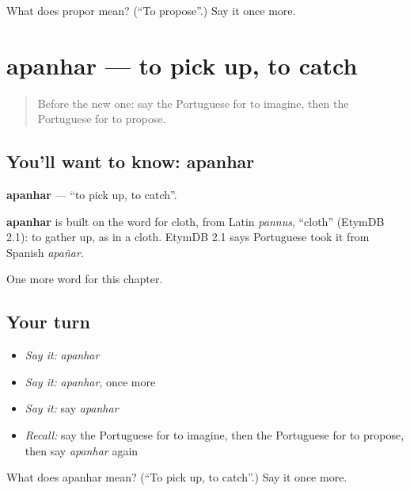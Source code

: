\begin{tcolorbox}[breakable,colback=teal!4,colframe=teal!35!black,title={Before you move on}]
What does propor mean? (\textquotedblleft{}To propose\textquotedblright{}.) Say it once more.
\end{tcolorbox}
\section[apanhar]{apanhar — to pick up, to catch}

\label{lesson:PT-C143-apanhar}



\begin{quote}
Before the new one: say the Portuguese for to imagine, then the Portuguese for to propose.
\end{quote}

\subsection*{You'll want to know: apanhar}
\textbf{apanhar} — \textquotedblleft{}to pick up, to catch\textquotedblright{}.

\begin{cousinweb}
\textbf{apanhar} is built on the word for cloth, from Latin \emph{pannus}, \textquotedblleft{}cloth\textquotedblright{} (EtymDB 2.1): to gather up, as in a cloth. EtymDB 2.1 says Portuguese took it from Spanish \emph{apañar}.
\end{cousinweb}

\begin{grammarlens}[title={What you've built}]
One more word for this chapter.
\end{grammarlens}

\subsection*{Your turn}
\begin{itemize}
\raggedright
  \item \emph{Say it:} \emph{apanhar}
  \item \emph{Say it:} \emph{apanhar}, once more
  \item \emph{Say it:} say \emph{apanhar}
  \item \emph{Recall:} say the Portuguese for to imagine, then the Portuguese for to propose, then say \emph{apanhar} again
\end{itemize}

\begin{tcolorbox}[breakable,colback=teal!4,colframe=teal!35!black,title={Before you move on}]
What does apanhar mean? (\textquotedblleft{}To pick up, to catch\textquotedblright{}.) Say it once more.
\end{tcolorbox}
